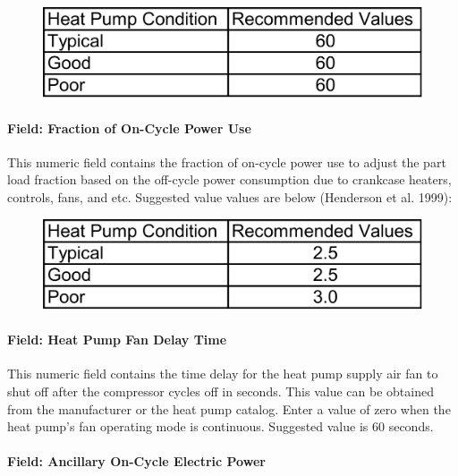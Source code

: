 \begin{figure}[htbp]
\centering
\includegraphics{media/image296.png}
\caption{}
\end{figure}

\paragraph{Field: Fraction of On-Cycle Power Use}\label{field-fraction-of-on-cycle-power-use-000}

This numeric field contains the fraction of on-cycle power use to adjust the part load fraction based on the off-cycle power consumption due to crankcase heaters, controls, fans, and etc. Suggested value values are below (Henderson et al. 1999):

\begin{figure}[htbp]
\centering
\includegraphics{media/image297.png}
\caption{}
\end{figure}

\paragraph{Field: Heat Pump Fan Delay Time}\label{field-heat-pump-fan-delay-time-000}

This numeric field contains the time delay for the heat pump supply air fan to shut off after the compressor cycles off in seconds. This value can be obtained from the manufacturer or the heat pump catalog. Enter a value of zero when the heat pump's fan operating mode is continuous. Suggested value is 60 seconds.

\paragraph{Field: Ancillary On-Cycle Electric Power}\label{field-ancillary-on-cycle-electric-power}

